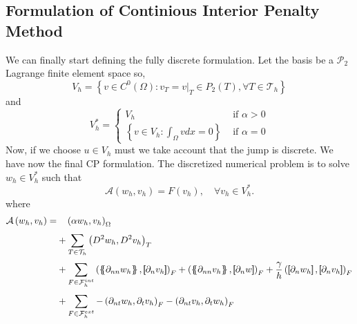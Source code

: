 \subsection{Formulation of Continious Interior Penalty Method}%
\label{sub:formulation_of_continious_interior_penalty_method}


We can finally start defining the fully discrete formulation. Let the basis be a $\mathcal{P}_{2} $ Lagrange finite element space so,
\[
V_{h} = \left\{ v \in C^{0}\left( \Omega  \right): v_{T} = v | _{T} \in P_{2}\left( T \right), \forall T \in
\mathcal{T}_{h}    \right\}
\]
and
\[
V_{h}^{*} = \begin{cases}
    V_{h} & \text{ if } \alpha  > 0 \\
    \left\{ v \in V_{h}: \int_{\Omega }^{} v dx   = 0   \right\} &  \text{ if } \alpha   = 0
\end{cases}
\]
Now, if we choose $u \in V_{h}$ must we take account that the jump is discrete.
 We have now the final CP formulation.
The discretized numerical problem is to solve $w_{h} \in V_{h}^{*}$ such that
\begin{equation}
\label{eq:CP_A_F}
\mathcal{A}\left( w_{h}, v_{h} \right)   = F\left( v_{h} \right), \quad \forall v_{h} \in V_{h}^{*}  .
\end{equation}
where
\begin{equation}
\label{eq:CP_A_h_1}
\begin{split}
\mathcal{A} \left( w_{h}, v_{h} \right)   =&
  \quad  \left( \alpha  w_{h}, v_{h} \right) _{\Omega }\\
&  + \sum_{T \in \mathcal{T} _{h}}^{} \left( D^2 w_{h}, D^2v_{h} \right) _{T} \\
 & +
  \sum_{F \in \mathcal{F}_{h}^{int} }^{}
  \left( \mean{  \partial _{n n} w_{h} }, \jump{ \partial _{n }v_{h}} \right)_{F}  +
 \left( \mean{ \partial _{n n} v_{h} }, \jump{ \partial _{n}w }      \right)_{F}
+ \frac{\gamma}{h}  \left( \jump{ \partial _{n} w_{h}}, \jump{ \partial _{n} v_{h}   }   \right)_{F}
 \\
 & +  \sum_ {F \in \mathcal{F}_{h} ^{ext}}^{}  -\left(\partial _{nt} w_{h} , \partial _{t}v_{h} \right)_{F} - \left(\partial _{nt} v_{h} , \partial _{t}w_{h} \right)_{F}
\end{split}
\end{equation}
